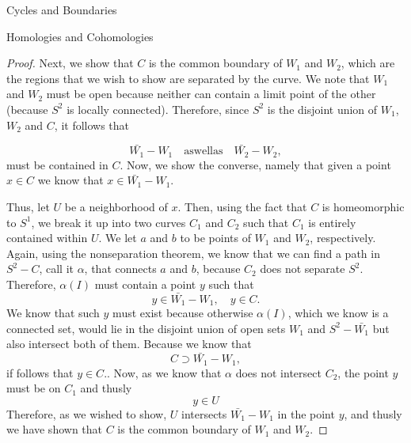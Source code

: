 \begin{subsubsection}{Cycles and Boundaries}
\begin{subsubsection}{Homologies and Cohomologies}
\begin{proof}
  Next, we show that $C$ is the common boundary of $W_1$ and $W_2$, which are
  the regions that we wish to show are separated by the curve. We note that
  $W_1$ and $W_2$ must be open because neither can contain a limit point of the
  other (because $S^2$ is locally connected). Therefore, since $S^2$ is the 
  disjoint union of $W_1$,$W_2$ and $C$, it follows that

  \begin{equation}
    \bar{W_1}-W_1\quad\mathrm{as well as}\quad \bar{W_2}-W_2,
  \end{equation}
  must be contained in $C$. Now, we show the converse, namely that given
  a point $x\in C$ we know that $x\in\bar{W_1}-W_1$.

  Thus, let $U$ be a neighborhood of $x$. Then, using the fact that $C$ is
  homeomorphic to $S^1$, we break it up into two curves $C_1$ and $C_2$ such
  that $C_1$ is entirely contained within $U$. We let $a$ and $b$ to be points
  of $W_1$ and $W_2$, respectively. Again, using the nonseparation theorem, we 
  know that we can find a path in $S^2-C$, call it $\alpha$, that connects $a$
  and $b$, because $C_2$ does not separate $S^2$. Therefore, $\alpha(I)$ must
  contain a point $y$ such that
  \begin{equation}
    y\in \bar{W_1}-W_1, \quad y\in C.
  \end{equation}
  We know that such $y$ must exist because otherwise $\alpha(I)$, which we know
  is a connected set, would lie in the disjoint union of open sets $W_1$ and
  $S^2-\bar{W_1}$ but also intersect both of them. Because we know that
  \begin{equation}
    C \supset \bar{W_1}-W_1,
  \end{equation}
  if follows that $y\in C.$. Now, as we know that $\alpha$ does not intersect
  $C_2$, the point $y$ must be on $C_1$ and thusly
  \begin{equation}
    y\in U
  \end{equation}
  Therefore, as we wished to show, $U$ intersects $\bar{W_1}-W_1$ in the point
  $y$, and thusly we have shown that $C$ is the common boundary of $W_1$ and
$W_2$.


\end{proof}
\end{subsubsection}
\end{subsubsection}
